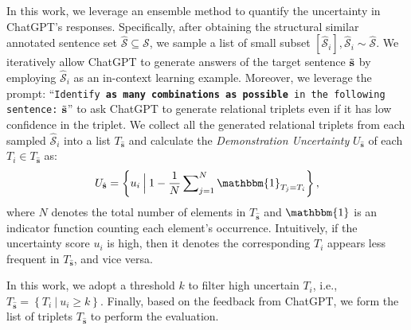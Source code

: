 \documentclass{article}
\begin{document}
In this work, we leverage an ensemble method to quantify the uncertainty in ChatGPT's responses. Specifically, after obtaining the structural similar annotated sentence set $\hat{\mathcal{S}} \subseteq \mathcal{S}$, we sample a list of small subset $[\hat{\mathcal{S}}_i], \hat{\mathcal{S}}_i \sim \hat{\mathcal{S}}$. We iteratively allow ChatGPT to generate answers of the target sentence $\Tilde{\mathbf{s}}$ by employing $\hat{\mathcal{S}}_i$ as an in-context learning example. Moreover, we leverage the prompt: ``\texttt{Identify \textbf{as many combinations as possible} in the following sentence:} $\Tilde{\mathbf{s}}$'' to ask ChatGPT to generate relational triplets even if it has low confidence in the triplet. We collect all the generated relational triplets from each sampled $\hat{\mathcal{S}}_i$ into a list $T_{\hat{\mathbf{s}}}$ and calculate the \textit{Demonstration Uncertainty} $U_{\hat{\mathbf{s}}}$ of each $T_i \in T_{\hat{\mathbf{s}}}$ as:
\begin{equation*}
    U_{\hat{\mathbf{s}}} = \left\{u_i\: \Big| \: 1-\frac{1}{N} \sum\nolimits_{j=1}^{N} \mathbbm{1}_{T_j=T_i}\right\},
\end{equation*}
where $N$ denotes the total number of elements in $T_{\hat{\mathbf{s}}}$ and $\mathbbm{1}$ is an indicator function counting each element's occurrence. Intuitively, if the uncertainty score $u_i$ is high, then it denotes the corresponding $T_i$ appears less frequent in $T_{\hat{\mathbf{s}}}$, and vice versa.

In this work, we adopt a threshold $k$ to filter high uncertain $T_i$, i.e., $T_{\hat{\mathbf{s}}} = \left\{T_i\: \Big| \: u_i \ge k\right\}$. Finally, based on the feedback from ChatGPT, we form the list of triplets $T_{\hat{\mathbf{s}}}$ to perform the evaluation.
\end{document}
